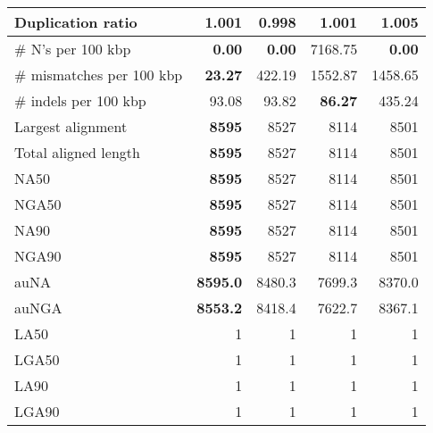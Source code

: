 \documentclass[12pt,a4paper]{article}
\begin{document}
\begin{table}[ht]
\begin{center}
\begin{tabular}{|l*{4}{|r}|}
Duplication ratio & 1.001 & {\bf 0.998} & 1.001 & 1.005 \\ \hline
\# N's per 100 kbp & {\bf 0.00} & {\bf 0.00} & 7168.75 & {\bf 0.00} \\ \hline
\# mismatches per 100 kbp & {\bf 23.27} & 422.19 & 1552.87 & 1458.65 \\ \hline
\# indels per 100 kbp & 93.08 & 93.82 & {\bf 86.27} & 435.24 \\ \hline
Largest alignment & {\bf 8595} & 8527 & 8114 & 8501 \\ \hline
Total aligned length & {\bf 8595} & 8527 & 8114 & 8501 \\ \hline
NA50 & {\bf 8595} & 8527 & 8114 & 8501 \\ \hline
NGA50 & {\bf 8595} & 8527 & 8114 & 8501 \\ \hline
NA90 & {\bf 8595} & 8527 & 8114 & 8501 \\ \hline
NGA90 & {\bf 8595} & 8527 & 8114 & 8501 \\ \hline
auNA & {\bf 8595.0} & 8480.3 & 7699.3 & 8370.0 \\ \hline
auNGA & {\bf 8553.2} & 8418.4 & 7622.7 & 8367.1 \\ \hline
LA50 & 1 & 1 & 1 & 1 \\ \hline
LGA50 & 1 & 1 & 1 & 1 \\ \hline
LA90 & 1 & 1 & 1 & 1 \\ \hline
LGA90 & 1 & 1 & 1 & 1 \\ \hline
\end{tabular}
\end{center}
\end{table}
\end{document}
